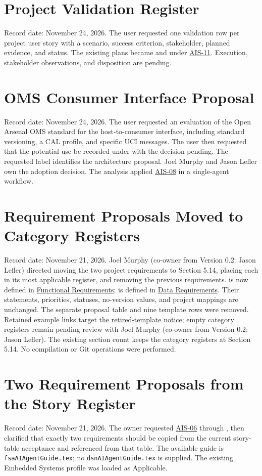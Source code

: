 \section{Project Validation Register}
Record date: November 24, 2026. The user requested one validation row per
project user story with a scenario, success criterion, stakeholder, planned
evidence, and status. The existing plans became  and
 under \hyperref[Skill:AIS-11]{AIS-11}. Execution,
stakeholder observations, and disposition are pending.

\section{OMS Consumer Interface Proposal}
Record date: November 24, 2026. The user requested an evaluation of the Open
Arsenal OMS standard for the host-to-consumer interface, including standard
versioning, a CAL profile, and specific UCI messages. The user then requested
that the potential use be recorded under 
with the decision pending. The requested label identifies the architecture
proposal. Joel Murphy and Jason Lefler own the adoption decision. The analysis
applied \hyperref[Skill:AIS-08]{AIS-08} in a single-agent workflow.

\section{Requirement Proposals Moved to Category Registers}
Record date: November 21, 2026. Joel Murphy (co-owner from Version 0.2: Jason Lefler) directed moving the two project
requirements to Section 5.14, placing each in its most applicable register,
and removing the previous requirements.  is now
defined in \hyperref[Table:FunctionalRequirements]{Functional Requirements};
 is defined in
\hyperref[Table:DataRequirements]{Data Requirements}. Their statements,
priorities, statuses, no-version values, and project mappings are unchanged.
The separate proposal table and nine template rows were removed. Retained
example links target \hyperref[Section:RetiredTemplateRequirements]{the
retired-template notice}; empty category registers remain pending review
with Joel Murphy (co-owner from Version 0.2: Jason Lefler). The existing section count keeps the category registers
at Section 5.14. No compilation or Git operations were performed.

\section{Two Requirement Proposals from the Story Register}
Record date: November 21, 2026. The owner requested
\hyperref[Skill:AIS-06]{AIS-06} through
, then clarified that exactly two
requirements should be copied from the current story-table acceptance and
referenced from that table. The available guide is
\texttt{fsaAIAgentGuide.tex}; no \texttt{dsnAIAgentGuide.tex} is supplied.
The existing Embedded Systems profile was loaded as Applicable.


